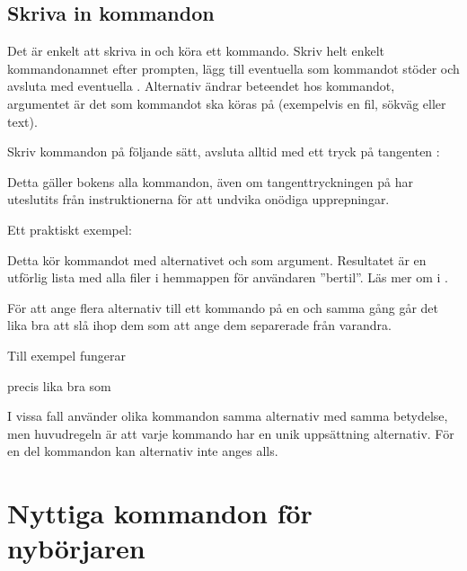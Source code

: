 \documentclass[a4paper,final]{memoir} %
\begin{document}
\subsection{Skriva in kommandon}

Det är enkelt att skriva in och köra ett kommando. Skriv helt enkelt kommandonamnet efter prompten, lägg till eventuella  som kommandot stöder och avsluta med eventuella . Alternativ ändrar beteendet hos kommandot, argumentet är det som kommandot ska köras på (exempelvis en fil, sökväg eller text).

Skriv kommandon på följande sätt, avsluta alltid med ett tryck på tangenten :


Detta gäller bokens alla kommandon, även om tangenttryckningen på  har uteslutits från instruktionerna för att undvika onödiga upprepningar.

Ett praktiskt exempel:


Detta kör kommandot  med alternativet  och  som argument. Resultatet är en utförlig lista med alla filer i hemmappen för användaren ''bertil''. Läs mer om  i .




För att ange flera alternativ till ett kommando på en och samma gång går det lika bra att slå ihop dem som att ange dem separerade från varandra.

Till exempel fungerar 


precis lika bra som 


I vissa fall använder olika kommandon samma alternativ med samma betydelse, men huvudregeln är att varje kommando har en unik uppsättning alternativ. För en del kommandon kan alternativ inte anges alls. 


\section{Nyttiga kommandon för nybörjaren}
\end{document}
